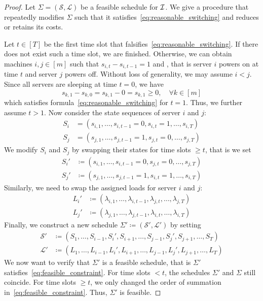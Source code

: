 \begin{proof}
Let $\Sigma=(\mathcal{S},\mathcal{L})$ be a feasible schedule for $\mathcal{I}$. We give a procedure that repeatedly modifies $\Sigma$ such that it satisfies~\eqref{eq:reasonable_switching} and reduces or retains its costs. 
	
Let $t\in[T]$ be the first time slot that falsifies~\eqref{eq:reasonable_switching}. If there does not exist such a time slot, we are finished. Otherwise, we can obtain machines $i,j\in[m]$ such that $s_{i,t}-s_{i,t-1}=1$ and , that is server $i$ powers on at time $t$ and server $j$ powers off. Without loss of generality, we may assume $i<j$. Since all servers are sleeping at time $t=0$, we have
\begin{equation*}
	s_{k,1}-s_{k,0}=s_{k,1}-0=s_{k,1}\ge 0,\quad\forall k\in[m]
\end{equation*}
which satisfies formula~\eqref{eq:reasonable_switching} for $t=1$. Thus, we further assume $t>1$. Now consider the state sequences of server $i$ and $j$:
\begin{align*}
	S_i&=(s_{i,1},\dotsc,s_{i,t-1}=0,s_{i,t}=1,\dotsc,s_{i,T})\\
	S_j&=(s_{j,1},\dotsc,s_{j,t-1}=1,s_{j,t}=0,\dotsc,s_{j,T})
\end{align*}
We modify $S_i$ and $S_j$ by swapping their states for time slots $\ge t$, that is we set
\begin{align*}
	S_i'&\coloneqq(s_{i,1},\dotsc,s_{i,t-1}=0,s_{j,t}=0,\dotsc,s_{j,T})\\
	S_j'&\coloneqq(s_{j,1},\dotsc,s_{j,t-1}=1,s_{i,t}=1,\dotsc,s_{i,T})
\end{align*}
Similarly, we need to swap the assigned loads for server $i$ and $j$:
\begin{align*}
	L_i'&\coloneqq(\lambda_{i,1},\dotsc,\lambda_{i,t-1},\lambda_{j,t},\dotsc,\lambda_{j,T})\\
	L_j'&\coloneqq(\lambda_{j,1},\dotsc,\lambda_{j,t-1},\lambda_{i,t},\dotsc,\lambda_{i,T})
\end{align*}
Finally, we construct a new schedule $\Sigma'\coloneqq(\mathcal{S}',\mathcal{L}')$ by setting
\begin{align*}
	\mathcal{S}'&\coloneqq(S_1,\dotsc,S_{i-1},S_i',S_{i+1},\dotsc,S_{j-1},S_j',S_{j+1},\dotsc,S_T)\\
	\mathcal{L}'&\coloneqq(L_1,\dotsc,L_{i-1},L_i',L_{i+1},\dotsc,L_{j-1},L_j',L_{j+1},\dotsc,L_T)
\end{align*}
We now want to verify that $\Sigma'$ is a feasible schedule, that is $\Sigma'$ satisfies~\eqref{eq:feasible_constraint}. For time slots $<t$, the schedules $\Sigma'$ and $\Sigma$ still coincide. For time slots $\ge t$, we only changed the order of summation in~\eqref{eq:feasible_constraint}. Thus, $\Sigma'$ is feasible.


\end{proof}
